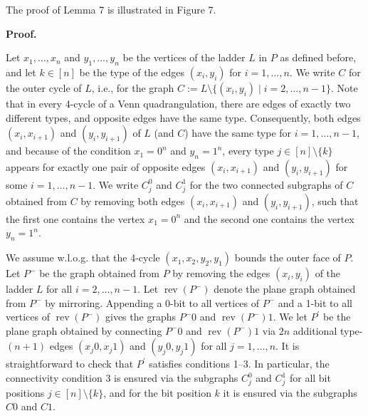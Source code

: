 \par
\par
The proof of Lemma 7 is illustrated in Figure 7.
\par
\par
\par\medskip\noindent\textbf{Proof.}\par
Let $x_{1},\ldots,x_{n}$ and $y_{1},\ldots,y_{n}$ be the vertices of the ladder $L$ in $P$ as defined before, and let $k\in[n]$ be the type of the edges $(x_{i},y_{i})$ for $i=1,\ldots,n$. We write $C$ for the outer cycle of $L$, i.e., for the graph $C:=L\setminus\{(x_{i},y_{i})\mid i=2,\ldots,n-1\}$. Note that in every 4-cycle of a Venn quadrangulation, there are edges of exactly two different types, and opposite edges have the same type. Consequently, both edges $(x_{i},x_{i+1})$ and $(y_{i},y_{i+1})$ of $L$ (and $C$) have the same type for $i=1,\ldots,n-1$, and because of the condition $x_{1}=0^{n}$ and $y_{n}=1^{n}$, every type $j\in[n]\setminus\{k\}$ appears for exactly one pair of opposite edges $(x_{i},x_{i+1})$ and $(y_{i},y_{i+1})$ for some $i=1,\ldots,n-1$. We write $C_{j}^{0}$ and $C_{j}^{1}$ for the two connected subgraphs of $C$ obtained from $C$ by removing both edges $(x_{i},x_{i+1})$ and $(y_{i},y_{i+1})$, such that the first one contains the vertex $x_{1}=0^{n}$ and the second one contains the vertex $y_{n}=1^{n}$.
\par
\par
We assume w.l.o.g. that the 4-cycle $(x_{1},x_{2},y_{2},y_{1})$ bounds the outer face of $P$. Let $P^{-}$ be the graph obtained from $P$ by removing the edges $(x_{i},y_{i})$ of the ladder $L$ for all $i=2,\ldots,n-1$. Let $\operatorname{rev}(P^{-})$ denote the plane graph obtained from $P^{-}$ by mirroring. Appending a 0-bit to all vertices of $P^{-}$ and a 1-bit to all vertices of $\operatorname{rev}(P^{-})$ gives the graphs $P^{-}0$ and $\operatorname{rev}(P^{-})1$. We let $P^{\prime}$ be the plane graph obtained by connecting $P^{-}0$ and $\operatorname{rev}(P^{-})1$ via $2n$ additional type-$(n+1)$ edges $(x_{j}0,x_{j}1)$ and $(y_{j}0,y_{j}1)$ for all $j=1,\ldots,n$. It is straightforward to check that $P^{\prime}$ satisfies conditions 1–3. In particular, the connectivity condition 3 is ensured via the subgraphs $C_{j}^{0}$ and $C_{j}^{1}$ for all bit positions $j\in[n]\setminus\{k\}$, and for the bit position $k$ it is ensured via the subgraphs $C0$ and $C1$.
